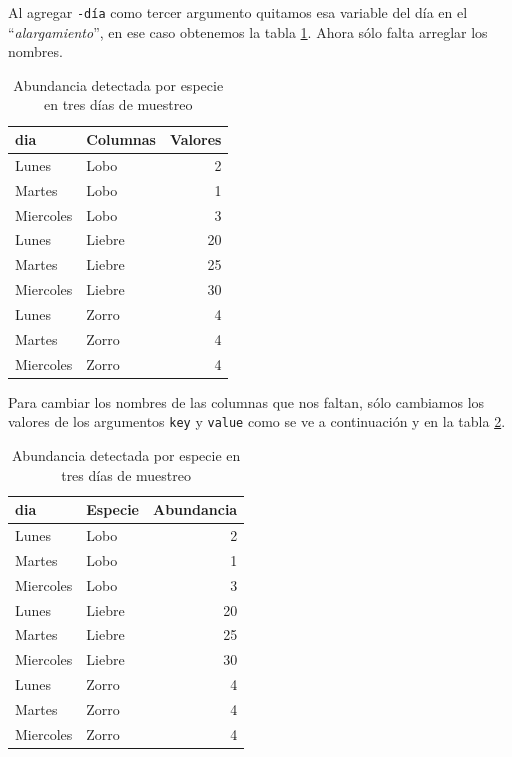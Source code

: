 \documentclass[]{book}
\newenvironment{Shaded}{\begin{snugshade}}{\end{snugshade}}
\newcommand{\DataTypeTok}[1]{\textcolor[rgb]{0.13,0.29,0.53}{#1}}
\newcommand{\KeywordTok}[1]{\textcolor[rgb]{0.13,0.29,0.53}{\textbf{#1}}}
\newcommand{\NormalTok}[1]{#1}
\newcommand{\OperatorTok}[1]{\textcolor[rgb]{0.81,0.36,0.00}{\textbf{#1}}}
\newcommand{\StringTok}[1]{\textcolor[rgb]{0.31,0.60,0.02}{#1}}
\begin{document}
Al agregar \texttt{-día} como tercer argumento quitamos esa variable del
día en el ``\emph{alargamiento}'', en ese caso obtenemos la tabla
\ref{tab:Larga2}. Ahora sólo falta arreglar los nombres.

\begin{table}

\caption{\label{tab:Larga2}Abundancia detectada por especie en tres días de muestreo}
\centering
\begin{tabular}[t]{llr}
\toprule
dia & Columnas & Valores\\
\midrule
Lunes & Lobo & 2\\
Martes & Lobo & 1\\
Miercoles & Lobo & 3\\
Lunes & Liebre & 20\\
Martes & Liebre & 25\\
\addlinespace
Miercoles & Liebre & 30\\
Lunes & Zorro & 4\\
Martes & Zorro & 4\\
Miercoles & Zorro & 4\\
\bottomrule
\end{tabular}
\end{table}

Para cambiar los nombres de las columnas que nos faltan, sólo cambiamos
los valores de los argumentos \texttt{key} y \texttt{value} como se ve a
continuación y en la tabla \ref{tab:Larga3}.

\begin{Shaded}
\end{Shaded}

\begin{table}

\caption{\label{tab:Larga3}Abundancia detectada por especie en tres días de muestreo}
\centering
\begin{tabular}[t]{llr}
\toprule
dia & Especie & Abundancia\\
\midrule
Lunes & Lobo & 2\\
Martes & Lobo & 1\\
Miercoles & Lobo & 3\\
Lunes & Liebre & 20\\
Martes & Liebre & 25\\
\addlinespace
Miercoles & Liebre & 30\\
Lunes & Zorro & 4\\
Martes & Zorro & 4\\
Miercoles & Zorro & 4\\
\bottomrule
\end{tabular}
\end{table}
\end{document}
